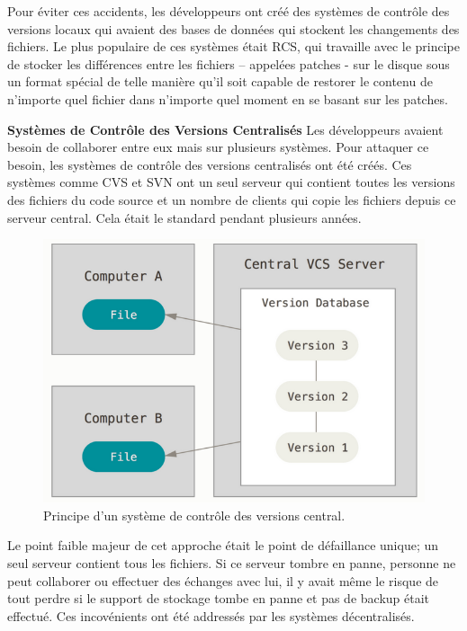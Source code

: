 \documentclass[a4paper,11pt,oneside]{report}
\begin{document}
Pour éviter ces accidents, les développeurs ont créé des systèmes de contrôle des versions locaux qui avaient des bases de données qui stockent les changements des fichiers. Le plus populaire de ces systèmes était RCS, qui travaille avec le principe de stocker les différences entre les fichiers – appelées patches - sur le disque sous un format spécial de telle manière qu’il soit capable de restorer le contenu de n’importe quel fichier dans n’importe quel moment en se basant sur les patches.
\newline

\textbf{Systèmes de Contrôle des Versions Centralisés} \newline
Les développeurs avaient besoin de collaborer entre eux mais sur plusieurs systèmes. Pour attaquer ce besoin, les systèmes de contrôle des versions centralisés ont été créés. Ces systèmes comme CVS et SVN ont un seul serveur qui contient toutes les versions des fichiers du code source et un nombre de clients qui copie les fichiers depuis ce serveur central. Cela était le standard pendant plusieurs années.

\begin{figure}[H]
    \centering
    \includegraphics[width=12cm]{central-scm.png}
    \caption{Principe d'un système de contrôle des versions central.}
    \label{fig:central-scm}
\end{figure}

Le point faible majeur de cet approche était le point de défaillance unique; un seul serveur contient tous les fichiers. Si ce serveur tombre en panne, personne ne peut collaborer ou effectuer des échanges avec lui, il y avait même le risque de tout perdre si le support de stockage tombe en panne et pas de backup était effectué. Ces incovénients ont été addressés par les systèmes décentralisés.
\newline
\end{document}
